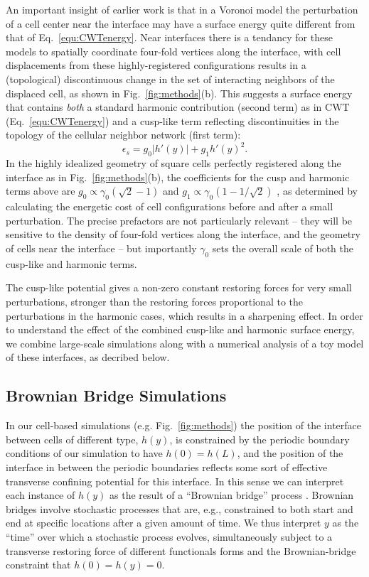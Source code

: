 \documentclass[twoside,twocolumn,9pt]{article}
\begin{document}
An important insight of earlier work\cite{sussman2018soft} is that in a Voronoi model the perturbation of a cell center near the interface may have a surface energy quite different from that of Eq.~\ref{equ:CWTenergy}. Near interfaces there is a tendancy for these models to spatially coordinate four-fold vertices along the interface, with cell displacements from these highly-registered configurations results in a (topological) discontinuous change in the set of interacting neighbors of the displaced cell, as shown in Fig.~\ref{fig:methods}(b). This suggests a surface energy that contains \emph{both} a standard harmonic contribution (second term) as in CWT (Eq.~\ref{equ:CWTenergy}) and a cusp-like term reflecting discontinuities in the topology of the cellular neighbor network (first term):
\begin{equation}
    \epsilon_s = g_0 |h'(y)| + g_1 h'(y)^2.
\end{equation}
In the highly idealized geometry of square cells perfectly registered along the interface as in Fig.~\ref{fig:methods}(b), the coefficients for the cusp and harmonic terms above are  $g_0 \propto \gamma_0(\sqrt{2}-1)$ and $g_1 \propto \gamma_0(1-1/\sqrt{2})$ \cite{sussman2018soft}, as determined by calculating the energetic cost of cell configurations before and after a small perturbation. The precise prefactors are not particularly relevant -- they will be sensitive to the density of four-fold vertices along the interface, and the geometry of cells near the interface -- but importantly $\gamma_0$ sets the overall scale of both the cusp-like and harmonic terms. 

The cusp-like potential gives a non-zero constant restoring forces for very small perturbations, stronger than the restoring forces proportional to the perturbations in the harmonic cases, which results in a sharpening effect\cite{sussman2018soft,lawson2024differences}. In order to understand the effect of the combined cusp-like and harmonic surface energy, we combine large-scale simulations along with a numerical analysis of a toy model of these interfaces, as decribed below. 

\subsection{Brownian Bridge Simulations\label{sec:BrownianBridgeSimulations}}
In our cell-based simulations (e.g. Fig.~\ref{fig:methods}) the position of the interface between cells of different type, $h(y)$, is constrained by the periodic boundary conditions of our simulation to have $h(0)=h(L)$, and the position of the interface in between the periodic boundaries reflects some sort of effective transverse confining potential for this interface. In this sense we can interpret each instance of $h(y)$ as the result of a ``Brownian bridge'' process \cite{ross1995stochastic}. Brownian bridges involve stochastic processes that are, e.g., constrained to both start and end at specific locations after a given amount of time. We thus interpret $y$ as the ``time'' over which a stochastic process evolves, simultaneously subject to a transverse restoring force of different functionals forms and the Brownian-bridge constraint that $h(0)=h(y)=0$. 
\end{document}
